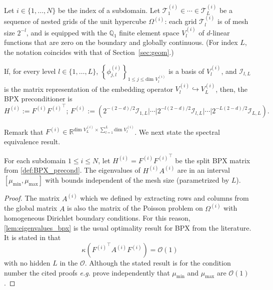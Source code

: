\documentclass[onefignum,onetabnum]{siamart251216}
\begin{document}
\begin{definition} Let $i \in \{ 1, \dots, N \}$ be the index of a subdomain. Let $\mathcal{T}^{(i)}_1 \in \cdots \in \mathcal{T}^{(i)}_L$ be a sequence of nested grids of the unit hypercube $\Omega^{(i)}$: each grid $\mathcal{T}^{(i)}_l$ is of mesh size $2^{-l}$, and is equipped with the $\mathbb Q_1$ finite element space $V_l^{(i)}$ of $d$-linear functions that are zero on the boundary and globally continuous. (For index $L$, the notation coincides with that of Section~\ref{sec:geom}.)

If, for every level $l \in \{ 1, \dots, L \}$, $\left\{ \phi_{j,l}^{(i)} \right\}_{1 \leq j \leq \text{dim } V_l^{(i)}}$ is a basis of $V_l^{(i)}$, and $\mathcal I_{l,L}$ is the matrix representation of the embedding operator $V_l^{(i)} \hookrightarrow V_L^{(i)}$, then, the BPX preconditioner is  
\begin{equation*}
 H^{(i)} := F^{(i)} {F^{(i)}}^\top; \, F^{(i)} := (2^{-(2-d)/2} \mathcal I_{1,L} | \cdots |2^{-l(2-d)/2} \mathcal I_{l,L} | \cdots |2^{-L(2-d)/2} \mathcal I_{L,L}  ).
\end{equation*}
\label{def:BPX_precond}
\end{definition}
Remark that $F^{(i)} \in\mathbb{R}^{\text{dim } V_L^{(i)} \times \sum_{l=1}^L \text{dim } V_l^{(i)} }$. We next state the spectral equivalence result.
\begin{lemma}
For each subdomain $1\leq i \leq N$, let $H^{(i)} = F^{(i)} {F^{(i)}}^\top$ be the split BPX matrix from \cref{def:BPX_precond}. The eigenvalues of $H^{(i)} A^{(i)}$ are in an interval $[\mu_{\min}, \mu_{\max}]$ with bounds independent of the mesh size (parametrized by $L$). 
\label{lem:eigenvalues_bpx}
\end{lemma}
\begin{proof}The matrix $A^{(i)}$ which we defined by extracting rows and columns from the global matrix $A$ is also the matrix of the Poisson problem on $\Omega^{(i)}$ with homogeneous Dirichlet boundary conditions. For this reason, \cref{lem:eigenvalues_bpx} is the usual optimality result for BPX from the literature. It is stated in \cite[Lemma 5.1]{Deiml_2025} that
\[
 \kappa({F^{(i)}}^\top  A^{(i)} F^{(i)}) = \mathcal O (1) 
\]
with no hidden $L$ in the $ \mathcal O$. Although the stated result is for the condition number the cited proofs \textit{e.g.} \cite{zbMATH00168423} prove independently that $\mu_{\min}$ and $\mu_{\max}$ are $\mathcal O (1) $. 
\end{proof}
\end{document}
